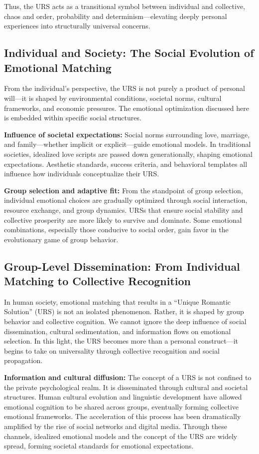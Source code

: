 \documentclass[12pt]{article}
\begin{document}
Thus, the URS acts as a transitional symbol between individual and collective, chaos and order, probability and determinism—elevating deeply personal experiences into structurally universal concerns.

\subsection{Individual and Society: The Social Evolution of Emotional Matching}

From the individual’s perspective, the URS is not purely a product of personal will—it is shaped by environmental conditions, societal norms, cultural frameworks, and economic pressures. The emotional optimization discussed here is embedded within specific social structures.

\textbf{Influence of societal expectations:} Social norms surrounding love, marriage, and family—whether implicit or explicit—guide emotional models. In traditional societies, idealized love scripts are passed down generationally, shaping emotional expectations. Aesthetic standards, success criteria, and behavioral templates all influence how individuals conceptualize their URS.

\textbf{Group selection and adaptive fit:} From the standpoint of group selection, individual emotional choices are gradually optimized through social interaction, resource exchange, and group dynamics. URSs that ensure social stability and collective prosperity are more likely to survive and dominate. Some emotional combinations, especially those conducive to social order, gain favor in the evolutionary game of group behavior.

\subsection{Group-Level Dissemination: From Individual Matching to Collective Recognition}

In human society, emotional matching that results in a ``Unique Romantic Solution'' (URS) is not an isolated phenomenon. Rather, it is shaped by group behavior and collective cognition. We cannot ignore the deep influence of social dissemination, cultural sedimentation, and information flows on emotional selection. In this light, the URS becomes more than a personal construct—it begins to take on universality through collective recognition and social propagation.

\textbf{Information and cultural diffusion:} The concept of a URS is not confined to the private psychological realm. It is disseminated through cultural and societal structures. Human cultural evolution and linguistic development have allowed emotional cognition to be shared across groups, eventually forming collective emotional frameworks. The acceleration of this process has been dramatically amplified by the rise of social networks and digital media. Through these channels, idealized emotional models and the concept of the URS are widely spread, forming societal standards for emotional expectations.
\end{document}
